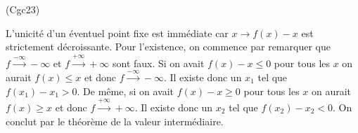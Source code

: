 \begin{tiny}(Cgc23)\end{tiny} L'unicité d'un éventuel point fixe est immédiate car $x\rightarrow f(x) - x$ est strictement décroissante. \newline
Pour l'existence, on commence par remarquer que $f\xrightarrow{-\infty}-\infty$ et $f\xrightarrow{+\infty}+\infty$ sont faux. \newline
Si on avait $f(x)-x\leq 0$ pour tous les $x$ on aurait $f(x)\leq x$ et donc  $f\xrightarrow{-\infty}-\infty$. Il existe donc un $x_1$ tel que $f(x_1)-x_1>0$. \newline
De même, si on avait $f(x)-x\geq 0$ pour tous les $x$ on aurait $f(x)\geq x$ et donc  $f\xrightarrow{+\infty}+\infty$. Il existe donc un $x_2$ tel que $f(x_2)-x_2<0$. \newline
On conclut par le théorème de la valeur intermédiaire.